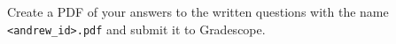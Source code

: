 \documentclass{16384_doc}
\begin{document}





\begin{submissionChecklist}
        \item Create a PDF of your answers to the written questions with the name \verb!<andrew_id>.pdf! and submit it to Gradescope.
\end{submissionChecklist}
\end{document}
